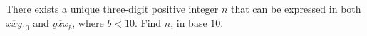 There exists a unique three-digit positive integer $n$ that can be expressed in both $\overline{xxy}_{10}$ and $\overline{yxx}_{b}$, where $b<10$. Find $n$, in base $10$.
